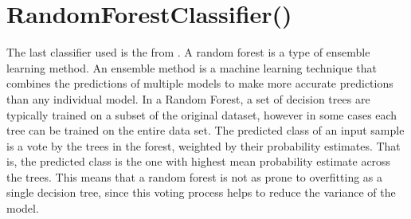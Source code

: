\section{RandomForestClassifier()}
The last classifier used is the  from .
A random forest is a type of ensemble learning method.
An ensemble method is a machine learning technique that combines the predictions of multiple models to make more accurate predictions than any individual model.
In a Random Forest, a set of decision trees are typically trained on a subset of the original dataset, however in some cases each tree can be trained on the entire data set.
The predicted class of an input sample is a vote by the trees in the forest, weighted by their probability estimates.
That is, the predicted class is the one with highest mean probability estimate across the trees.
This means that a random forest is not as prone to overfitting as a single decision tree, since this voting process helps to reduce the variance of the model.